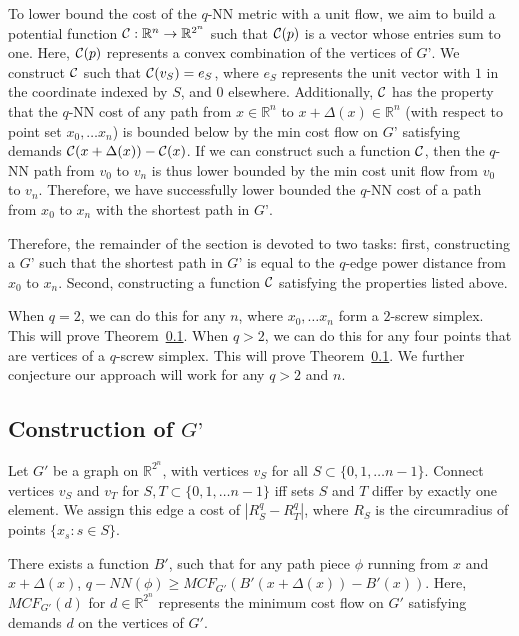 To lower bound the cost of the $q$-NN metric with a unit flow, we aim to build
a potential function $\mathcal{C}:\mathbb{R}^n \rightarrow \mathbb{R}^{2^n}$ such
that $\mathcal{C}(p)$ is a vector whose entries sum to one. Here, $\mathcal{C}(p)$
represents a convex combination of the vertices of $G’$. We construct $\mathcal{C}$
such that $\mathcal{C}(v_S) = e_S$, where $e_S$ represents the unit vector with $1$
in the coordinate indexed by $S$, and $0$ elsewhere. Additionally, $\mathcal{C}$ has
the property that the $q$-NN cost of any path from $x \in \mathbb{R}^n$ to
$x+\Delta(x) \in \mathbb{R}^n$ (with respect to point set $x_0, \ldots x_n$) is
bounded below by the min cost flow on $G’$ satisfying demands
$\mathcal{C}(x+\Delta(x)) - \mathcal{C}(x)$. If we can construct such a function $\mathcal{C}$,
then the $q$-NN path from $v_0$ to $v_n$ is thus lower bounded by the min cost
unit flow from $v_0$ to $v_n$. Therefore, we have successfully lower bounded
the $q$-NN cost of a path from $x_0$ to $x_n$ with the shortest path in $G’$.

Therefore, the remainder of the section is devoted to two tasks: first,
constructing a $G’$ such that the shortest path in $G’$ is equal to the
$q$-edge power distance from $x_0$ to $x_n$. Second, constructing a function
$\mathcal{C}$ satisfying the properties listed above.

When $q = 2$, we can do this for any $n$, where $x_0, \ldots x_n$ form a
$2$-screw simplex. This will prove Theorem~\ref{}. When $q > 2$, we can do this
for any four points that are vertices of a $q$-screw simplex. This will prove
Theorem~\ref{}. We further conjecture our approach will work for any $q > 2$
and $n$.

\subsection{Construction of $G’$}

Let $G'$ be a graph on $\mathbb{R}^{2^n}$, with vertices $v_{S}$ for all $S
\subset \{0,1,\ldots n-1\}$. Connect vertices $v_S$ and $v_T$ for $S, T \subset
\{0, 1, \ldots n-1\}$ iff sets $S$ and $T$ differ by exactly one element. We
assign this edge a cost of $|R_{S}^q - R_{T}^q|$, where $R_{S}$ is the
circumradius of points $\{x_s : s \in S\}$.

\begin{lemma}\label{lem:flow}There exists a function $B'$, such that for any
path piece $\phi$ running from $x$ and $x+\Delta(x)$, $q-NN(\phi) \geq
MCF_{G'}(B'(x+\Delta(x))-B'(x))$. Here, $MCF_{G'}(d)$ for $d \in
\mathbb{R}^{2^n}$ represents the minimum cost flow on $G'$ satisfying demands
$d$ on the vertices of $G'$.

\end{lemma}

